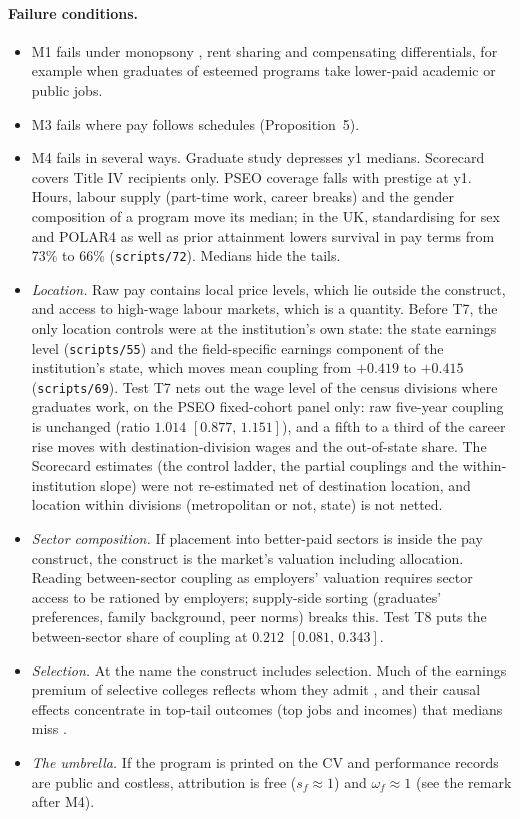 \documentclass[11pt]{article}
\newcommand{\ci}[2]{$[#1,\allowbreak\,#2]$}
\begin{document}
\paragraph{Failure conditions.}
\begin{itemize}
\item M1 fails under monopsony \citep{staiger2010there}, rent sharing and compensating differentials, for example
when graduates of esteemed programs take lower-paid academic or public jobs.
\item M3 fails where pay follows schedules (Proposition~5).
\item M4 fails in several ways. Graduate study depresses y1 medians. Scorecard covers Title IV recipients only.
PSEO coverage falls with prestige at y1. Hours, labour supply (part-time work, career breaks) and the gender
composition of a program move its median; in the UK, standardising for sex and POLAR4 as well as prior
attainment lowers survival in pay terms from 73\% to 66\% (\texttt{scripts/72}). Medians hide the tails.
\item \emph{Location.} Raw pay contains local price levels, which lie outside the construct, and access to
high-wage labour markets, which is a quantity. Before T7, the only location controls were at the institution's
own state: the state earnings level (\texttt{scripts/55}) and the field-specific earnings component of the
institution's state, which moves mean coupling from $+0.419$ to $+0.415$ (\texttt{scripts/69}). Test T7 nets out
the wage level of the census divisions where graduates work, on the PSEO fixed-cohort panel only: raw five-year
coupling is unchanged (ratio $1.014$ \ci{0.877}{1.151}), and a fifth to a third of the career rise moves with
destination-division wages and the out-of-state share. The Scorecard estimates (the control ladder, the partial
couplings and the within-institution slope) were not re-estimated net of destination location, and location within
divisions (metropolitan or not, state) is not netted.
\item \emph{Sector composition.} If placement into better-paid sectors is inside the pay construct, the construct
is the market's valuation including allocation. Reading between-sector coupling as employers' valuation requires
sector access to be rationed by employers; supply-side sorting (graduates' preferences, family background, peer norms) breaks this. Test T8 puts the
between-sector share of coupling at $0.212$ \ci{0.081}{0.343}.
\item \emph{Selection.} At the name the construct includes selection. Much of the earnings premium of selective
colleges reflects whom they admit \citep{dale2002estimating,dale2014estimating}, and their causal effects
concentrate in top-tail outcomes (top jobs and incomes) that medians miss \citep{zimmerman2019elite,chetty2023diversifying}.
\item \emph{The umbrella.} If the program is printed on the CV and performance records are public and costless,
attribution is free ($s_f\approx1$) and $\omega_f\approx1$ (see the remark after M4).
\end{itemize}
\end{document}
